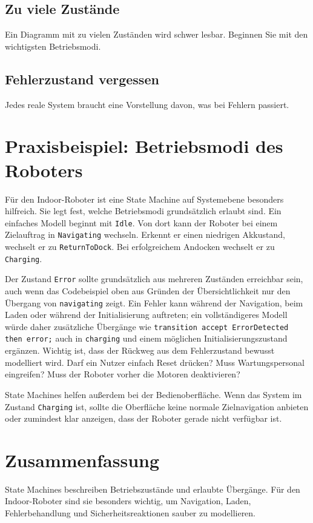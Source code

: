 \subsection{Zu viele Zustände}
Ein Diagramm mit zu vielen Zuständen wird schwer lesbar. Beginnen Sie mit den wichtigsten Betriebsmodi.

\subsection{Fehlerzustand vergessen}
Jedes reale System braucht eine Vorstellung davon, was bei Fehlern passiert.

\section{Praxisbeispiel: Betriebsmodi des Roboters}
Für den Indoor-Roboter ist eine State Machine auf Systemebene besonders hilfreich. Sie legt fest, welche Betriebsmodi grundsätzlich erlaubt sind. Ein einfaches Modell beginnt mit \texttt{Idle}. Von dort kann der Roboter bei einem Zielauftrag in \texttt{Navigating} wechseln. Erkennt er einen niedrigen Akkustand, wechselt er zu \texttt{ReturnToDock}. Bei erfolgreichem Andocken wechselt er zu \texttt{Charging}.

Der Zustand \texttt{Error} sollte grundsätzlich aus mehreren Zuständen erreichbar sein, auch wenn das Codebeispiel oben aus Gründen der Übersichtlichkeit nur den Übergang von \texttt{navigating} zeigt. Ein Fehler kann während der Navigation, beim Laden oder während der Initialisierung auftreten; ein vollständigeres Modell würde daher zusätzliche Übergänge wie \texttt{transition accept ErrorDetected then error;} auch in \texttt{charging} und einem möglichen Initialisierungszustand ergänzen. Wichtig ist, dass der Rückweg aus dem Fehlerzustand bewusst modelliert wird. Darf ein Nutzer einfach Reset drücken? Muss Wartungspersonal eingreifen? Muss der Roboter vorher die Motoren deaktivieren?

State Machines helfen außerdem bei der Bedienoberfläche. Wenn das System im Zustand \texttt{Charging} ist, sollte die Oberfläche keine normale Zielnavigation anbieten oder zumindest klar anzeigen, dass der Roboter gerade nicht verfügbar ist.

\section{Zusammenfassung}
State Machines beschreiben Betriebszustände und erlaubte Übergänge. Für den Indoor-Roboter sind sie besonders wichtig, um Navigation, Laden, Fehlerbehandlung und Sicherheitsreaktionen sauber zu modellieren.

